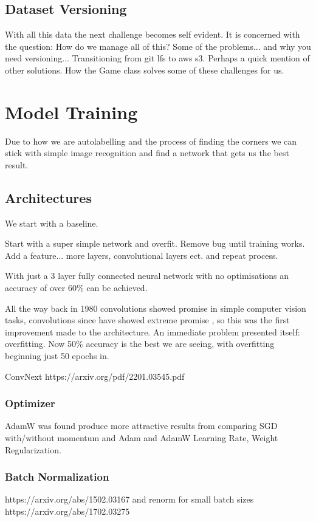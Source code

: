 \subsection{Dataset Versioning}
With all this data the next challenge becomes self evident.
It is concerned with the question: How do we manage all of this?
Some of the problems... and why you need versioning...
Transitioning from git lfs to aws s3.  Perhaps a quick mention of other solutions.
How the Game class solves some of these challenges for us.


\section{Model Training}
Due to how we are autolabelling and the process of finding the corners we can stick with simple
image recognition and find a network that gets us the best result.

\subsection{Architectures}
We start with a baseline.

Start with a super simple network and overfit.  Remove bug until training works.
Add a feature... more layers, convolutional layers ect. and repeat process.

With just a 3 layer fully connected neural network with no optimisations an accuracy of over 60\% can be achieved.

All the way back in 1980 \cite{} convolutions showed promise in simple computer vision tasks, 
convolutions since have showed extreme promise \cite{}, so this was the first improvement made 
to the architecture.  
An immediate problem presented itself: overfitting.  Now 50\% accuracy is the best we are seeing, with overfitting
beginning just 50 epochs in.

ConvNext https://arxiv.org/pdf/2201.03545.pdf

\subsubsection{Optimizer}
AdamW was found produce more attractive results from comparing SGD with/without momentum and Adam and AdamW \cite{}
Learning Rate, Weight Regularization.

\subsubsection{Batch Normalization}
https://arxiv.org/abs/1502.03167 and renorm for small batch sizes https://arxiv.org/abs/1702.03275

